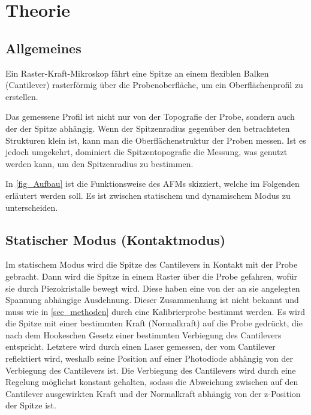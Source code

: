 \documentclass[
	a4paper,
	12pt,
	pagesize,
	ngerman
]{scrartcl}
\begin{document}
	\section{Theorie}
	\label{sec_theorie}

	\subsection{Allgemeines}
	Ein Raster-Kraft-Mikroskop fährt eine Spitze an einem flexiblen Balken (Cantilever) rasterförmig über die Probenoberfläche, um ein Oberflächenprofil zu erstellen.

	Das gemessene Profil ist nicht nur von der Topografie der Probe, sondern auch der der Spitze abhängig.
	Wenn der Spitzenradius gegenüber den betrachteten Strukturen klein ist, kann man die Oberflächenstruktur der Proben messen.
	Ist es jedoch umgekehrt, dominiert die Spitzentopografie die Messung, was genutzt werden kann, um den Spitzenradius zu bestimmen.

	In \cref{fig_Aufbau} ist die Funktionsweise des AFMs skizziert, welche im Folgenden erläutert werden soll.
	Es ist zwischen statischem und dynamischem Modus zu unterscheiden.



	\subsection{Statischer Modus (Kontaktmodus)}
	Im statischem Modus wird die Spitze des Cantilevers in Kontakt mit der Probe gebracht.
	Dann wird die Spitze in einem Raster über die Probe gefahren, wofür sie durch Piezokristalle bewegt wird.
	Diese haben eine von der an sie angelegten Spannung abhängige Ausdehnung.
	Dieser Zusammenhang ist nicht bekannt und muss wie in \cref{sec_methoden} durch eine Kalibrierprobe bestimmt werden.
	Es wird die Spitze mit einer bestimmten Kraft (Normalkraft) auf die Probe gedrückt, die nach dem Hookeschen Gesetz einer bestimmten Verbiegung des Cantilevers entspricht.
	Letztere wird durch einen Laser gemessen, der vom Cantilever  reflektiert wird, weshalb seine Position auf einer Photodiode abhängig von der Verbiegung des Cantilevers ist. %
	Die Verbiegung des Cantilevers wird durch eine Regelung möglichst konstant gehalten, sodass die Abweichung zwischen auf den Cantilever ausgewirkten Kraft und der Normalkraft abhängig von der z-Position der Spitze ist.
\end{document}
